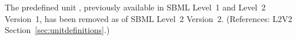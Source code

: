 The predefined unit , previously available in SBML
Level~1 and Level~2 Version~1, has been removed as of SBML Level~2
Version~2.  (References: L2V2 Section~\ref{sec:unitdefinitions}.)
